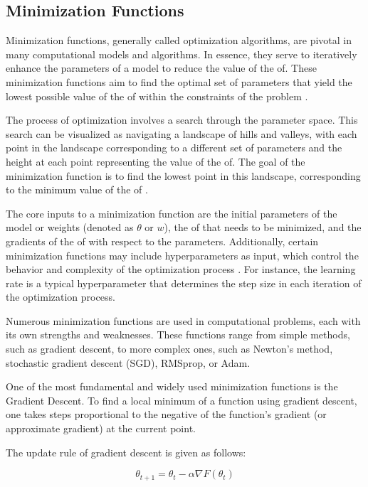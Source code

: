 \documentclass[
  a4paper,  %
  twoside,  %
  bibliography=totoc,
  headsepline,
  cleardoublepage=empty,
  parskip=half,
  draft=false
]{scrbook}
\begin{document}
\subsection{Minimization Functions}
\label{subsec:minimizationFunctions}
Minimization functions, generally called optimization algorithms, are pivotal in many computational models and algorithms.
In essence, they serve to iteratively enhance the parameters of a model to reduce the value of the \gls{of}.
These minimization functions aim to find the optimal set of parameters that yield the lowest possible value of the \gls{of} within the constraints of the problem \cite{Nocedal2006}.

The process of optimization involves a search through the parameter space.
This search can be visualized as navigating a landscape of hills and valleys, with each point in the landscape corresponding to a different set of parameters and the height at each point representing the value of the \gls{of}.
The goal of the minimization function is to find the lowest point in this landscape, corresponding to the minimum value of the \gls{of} \cite{Goodfellow2017}.

The core inputs to a minimization function are the initial parameters of the model or weights (denoted as \(\theta\) or \(w\)),
the \gls{of} that needs to be minimized, and the gradients of the \gls{of} with respect to the parameters.
Additionally, certain minimization functions may include hyperparameters as input, which control the behavior and complexity of the optimization process \cite{Virtanen2020}.
For instance, the learning rate is a typical hyperparameter that determines the step size in each iteration of the optimization process.

Numerous minimization functions are used in computational problems, each with its own strengths and weaknesses.
These functions range from simple methods, such as gradient descent, to more complex ones, such as Newton's method, stochastic gradient descent (SGD), RMSprop, or Adam.

One of the most fundamental and widely used minimization functions is the Gradient Descent.
To find a local minimum of a function using gradient descent, one takes steps proportional to the negative of the function's gradient (or approximate gradient) at the current point.

The update rule of gradient descent is given as follows:

\[
\theta_{t+1} = \theta_t - \alpha \nabla F(\theta_t)
\]
\end{document}
